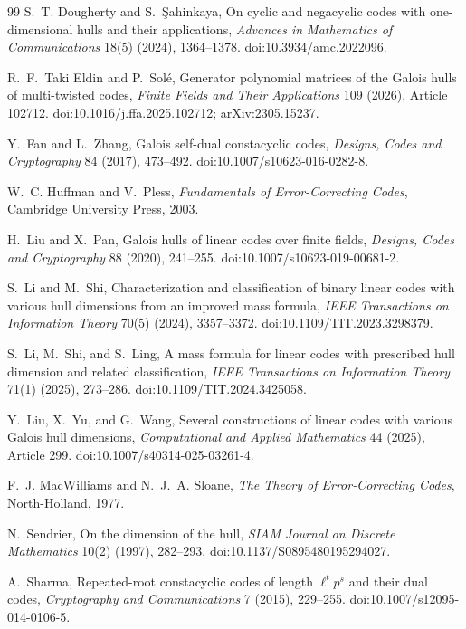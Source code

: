 \documentclass[11pt]{article}
\theoremstyle{definition}
\theoremstyle{remark}
\begin{document}
\begin{thebibliography}{99}
S.~T. Dougherty and S.~\c{S}ahinkaya,
On cyclic and negacyclic codes with one-dimensional hulls and their
applications,
\emph{Advances in Mathematics of Communications} 18(5) (2024),
1364--1378. doi:10.3934/amc.2022096.

R.~F.~Taki Eldin and P.~Sol\'e,
Generator polynomial matrices of the Galois hulls of multi-twisted codes,
\emph{Finite Fields and Their Applications} 109 (2026), Article 102712.
doi:10.1016/j.ffa.2025.102712; arXiv:2305.15237.

Y.~Fan and L.~Zhang,
Galois self-dual constacyclic codes,
\emph{Designs, Codes and Cryptography} 84 (2017), 473--492.
doi:10.1007/s10623-016-0282-8.

W.~C. Huffman and V.~Pless,
\emph{Fundamentals of Error-Correcting Codes},
Cambridge University Press, 2003.

H.~Liu and X.~Pan,
Galois hulls of linear codes over finite fields,
\emph{Designs, Codes and Cryptography} 88 (2020), 241--255.
doi:10.1007/s10623-019-00681-2.

S.~Li and M.~Shi,
Characterization and classification of binary linear codes with various
hull dimensions from an improved mass formula,
\emph{IEEE Transactions on Information Theory} 70(5) (2024),
3357--3372. doi:10.1109/TIT.2023.3298379.

S.~Li, M.~Shi, and S.~Ling,
A mass formula for linear codes with prescribed hull dimension and
related classification,
\emph{IEEE Transactions on Information Theory} 71(1) (2025),
273--286. doi:10.1109/TIT.2024.3425058.

Y.~Liu, X.~Yu, and G.~Wang,
Several constructions of linear codes with various Galois hull
dimensions,
\emph{Computational and Applied Mathematics} 44 (2025), Article 299.
doi:10.1007/s40314-025-03261-4.

F.~J. MacWilliams and N.~J.~A. Sloane,
\emph{The Theory of Error-Correcting Codes},
North-Holland, 1977.

N.~Sendrier,
On the dimension of the hull,
\emph{SIAM Journal on Discrete Mathematics} 10(2) (1997), 282--293.
doi:10.1137/S0895480195294027.

A.~Sharma,
Repeated-root constacyclic codes of length \(\ell^t p^s\) and their
dual codes,
\emph{Cryptography and Communications} 7 (2015), 229--255.
doi:10.1007/s12095-014-0106-5.


\end{thebibliography}
\end{document}

